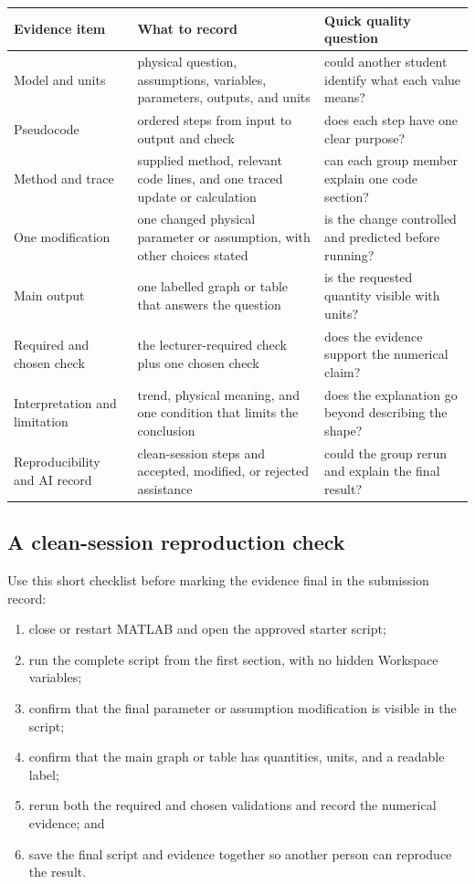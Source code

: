 \documentclass[11pt,a4paper]{article}
\begin{document}
\begin{center}\small
\begin{tabular}{>{\raggedright\arraybackslash}p{.23\linewidth}>{\raggedright\arraybackslash}p{.43\linewidth}>{\raggedright\arraybackslash}p{.23\linewidth}}
\toprule
\textbf{Evidence item} & \textbf{What to record} & \textbf{Quick quality question} \\
\midrule
Model and units & physical question, assumptions, variables, parameters, outputs, and units & could another student identify what each value means? \\
Pseudocode & ordered steps from input to output and check & does each step have one clear purpose? \\
Method and trace & supplied method, relevant code lines, and one traced update or calculation & can each group member explain one code section? \\
One modification & one changed physical parameter or assumption, with other choices stated & is the change controlled and predicted before running? \\
Main output & one labelled graph or table that answers the question & is the requested quantity visible with units? \\
Required and chosen check & the lecturer-required check plus one chosen check & does the evidence support the numerical claim? \\
Interpretation and limitation & trend, physical meaning, and one condition that limits the conclusion & does the explanation go beyond describing the shape? \\
Reproducibility and AI record & clean-session steps and accepted, modified, or rejected assistance & could the group rerun and explain the final result? \\
\bottomrule
\end{tabular}
\end{center}

\subsection*{A clean-session reproduction check}
Use this short checklist before marking the evidence final in the submission record:

\begin{enumerate}[nosep,leftmargin=7mm]
\item close or restart MATLAB and open the approved starter script;
\item run the complete script from the first section, with no hidden Workspace variables;
\item confirm that the final parameter or assumption modification is visible in the script;
\item confirm that the main graph or table has quantities, units, and a readable label;
\item rerun both the required and chosen validations and record the numerical evidence; and
\item save the final script and evidence together so another person can reproduce the result.
\end{enumerate}
\end{document}
